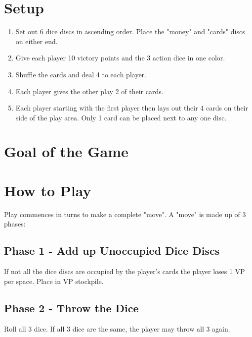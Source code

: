 \documentclass[12pt]{article}
\newenvironment{enumerateCustom}
{\begin{enumerate}
  \setlength{\itemsep}{1pt}
  \setlength{\parskip}{0pt}
  \setlength{\parsep}{0pt}}
{\end{enumerate}}
\begin{document}
\begin{mdframed}[style = customFrame]
\begin{multicols*}{2}

\section*{Setup}
\begin{enumerateCustom}
    \item Set out 6 dice discs in ascending order. Place the "money" and "cards" discs on either end.
    \item Give each player 10 victory points and the 3 action dice in one color.
    \item Shuffle the cards and deal 4 to each player.
    \item Each player gives the other play 2 of their cards.
    \item Each player starting with the first player then lays out their 4 cards on their side of the play area. Only 1 card can be placed next to any one disc.
\end{enumerateCustom}

\section*{Goal of the Game}
\section*{How to Play}
Play commences in turns to make a complete "move". A "move" is made up of 3 phases:

\subsection*{Phase 1 - Add up Unoccupied Dice Discs}
If not all the dice discs are occupied by the player's cards the player loses 1 VP per space. Place in VP stockpile.

\subsection*{Phase 2 - Throw the Dice}
Roll all 3 dice. If all 3 dice are the same, the player may throw all 3 again.


\end{multicols*}
\end{mdframed}
\end{document}
